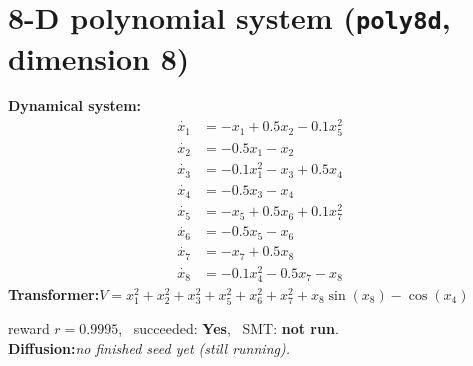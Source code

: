 \documentclass[11pt]{article}
\begin{document}
\section*{8-D polynomial system \quad (\texttt{poly8d}, dimension 8)}
\textbf{Dynamical system:}
\begin{align*}
\dot{x_{1}} &= - x_{1} + 0.5 x_{2} - 0.1 x_{5}^{2} \\
\dot{x_{2}} &= - 0.5 x_{1} - x_{2} \\
\dot{x_{3}} &= - 0.1 x_{1}^{2} - x_{3} + 0.5 x_{4} \\
\dot{x_{4}} &= - 0.5 x_{3} - x_{4} \\
\dot{x_{5}} &= - x_{5} + 0.5 x_{6} + 0.1 x_{7}^{2} \\
\dot{x_{6}} &= - 0.5 x_{5} - x_{6} \\
\dot{x_{7}} &= - x_{7} + 0.5 x_{8} \\
\dot{x_{8}} &= - 0.1 x_{4}^{2} - 0.5 x_{7} - x_{8} 
\end{align*}
\textbf{Transformer:}\quad $V = x_{1}^{2} + x_{2}^{2} + x_{3}^{2} + x_{5}^{2} + x_{6}^{2} + x_{7}^{2} + x_{8} \sin{\left(x_{8} \right)} - \cos{\left(x_{4} \right)}$
\par\noindent\hspace{1em}reward $r=0.9995$, \ succeeded: \textbf{Yes}, \ SMT: \textbf{not run}.\\[0.5ex]
\textbf{Diffusion:}\quad \emph{no finished seed yet (still running).}\\[1ex]
\end{document}

